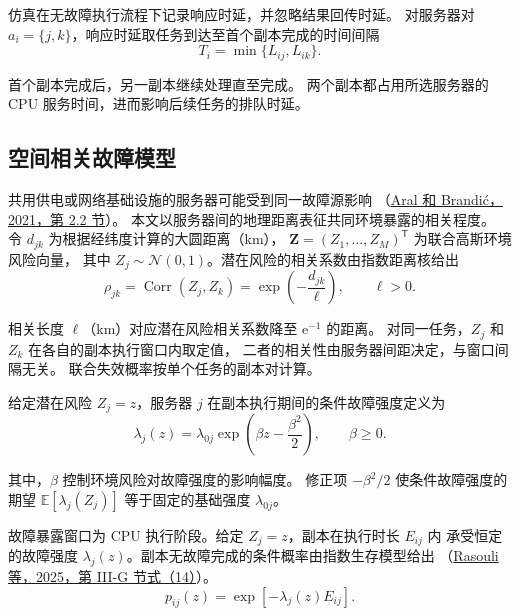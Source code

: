 \documentclass[UTF8,fontset=fandol]{ctexart}
\begin{document}
仿真在无故障执行流程下记录响应时延，并忽略结果回传时延。
对服务器对 \(a_i=\{j,k\}\)，响应时延取任务到达至首个副本完成的时间间隔
\begin{equation}
  T_i=\min\{L_{ij},L_{ik}\}.
  \label{eq:task-response-delay}
\end{equation}

首个副本完成后，另一副本继续处理直至完成。
两个副本都占用所选服务器的 CPU 服务时间，进而影响后续任务的排队时延。

\subsection{空间相关故障模型}
\label{sec:spatial-failure-model}

共用供电或网络基础设施的服务器可能受到同一故障源影响
（\href{https://doi.org/10.1109/TPDS.2020.3046188}{Aral 和 Brandić，2021，第 2.2 节}）。
本文以服务器间的地理距离表征共同环境暴露的相关程度。
令 \(d_{jk}\) 为根据经纬度计算的大圆距离（km），
\(\boldsymbol{Z}=(Z_1,\ldots,Z_M)^{\mathsf{T}}\) 为联合高斯环境风险向量，
其中 \(Z_j\sim\mathcal{N}(0,1)\)。潜在风险的相关系数由指数距离核给出
\begin{equation}
  \rho_{jk}=\operatorname{Corr}(Z_j,Z_k)
  =\exp\!\left(-\frac{d_{jk}}{\ell}\right),
  \qquad \ell>0.
  \label{eq:spatial-correlation}
\end{equation}

相关长度 \(\ell\)（km）对应潜在风险相关系数降至 \(\mathrm{e}^{-1}\) 的距离。
对同一任务，\(Z_j\) 和 \(Z_k\) 在各自的副本执行窗口内取定值，
二者的相关性由服务器间距决定，与窗口间隔无关。
联合失效概率按单个任务的副本对计算。

给定潜在风险 \(Z_j=z\)，服务器 \(j\) 在副本执行期间的条件故障强度定义为
\begin{equation}
  \lambda_j(z)=\lambda_{0j}\exp\!\left(\beta z-\frac{\beta^2}{2}\right),
  \qquad \beta\geq 0.
  \label{eq:conditional-failure-intensity}
\end{equation}

其中，\(\beta\) 控制环境风险对故障强度的影响幅度。
修正项 \(-\beta^2/2\) 使条件故障强度的期望 \(\mathbb{E}[\lambda_j(Z_j)]\)
等于固定的基础强度 \(\lambda_{0j}\)。

故障暴露窗口为 CPU 执行阶段。给定 \(Z_j=z\)，副本在执行时长 \(E_{ij}\) 内
承受恒定的故障强度 \(\lambda_j(z)\)。副本无故障完成的条件概率由指数生存模型给出
（\href{https://doi.org/10.1109/JIOT.2025.3592330}{Rasouli 等，2025，第 III-G 节式（14）}）。
\begin{equation}
  p_{ij}(z)=\exp\!\left[-\lambda_j(z)E_{ij}\right].
  \label{eq:conditional-replica-survival}
\end{equation}
\end{document}
